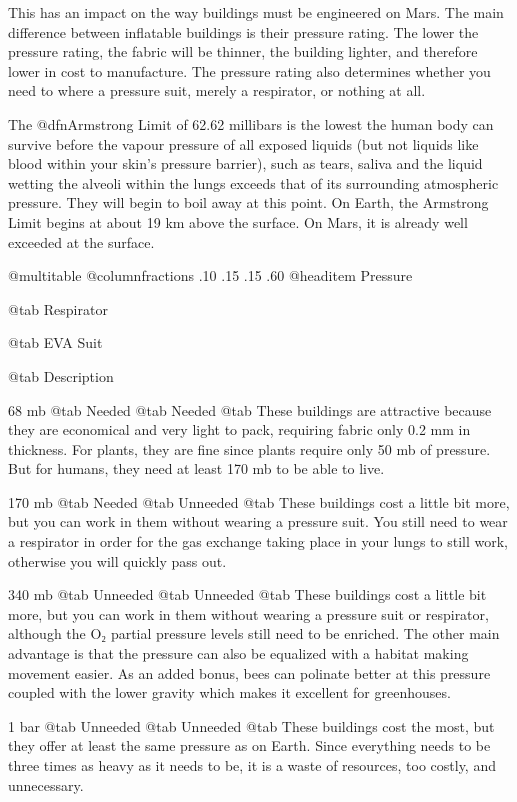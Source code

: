 This has an impact on the way buildings must be engineered on Mars. The main difference between inflatable buildings is their pressure rating. The lower the pressure rating, the fabric will be thinner, the building lighter, and therefore lower in cost to manufacture. The pressure rating also determines whether you need to where a pressure suit, merely a respirator, or nothing at all.

The @dfn{Armstrong Limit} of 62.62 millibars is the lowest the human body can survive before the vapour pressure of all exposed liquids (but not liquids like blood within your skin's pressure barrier), such as tears, saliva and the liquid wetting the alveoli within the lungs exceeds that of its surrounding atmospheric pressure. They will begin to boil away at this point. On Earth, the Armstrong Limit begins at about 19 km above the surface. On Mars, it is already well exceeded at the surface.

@multitable @columnfractions .10 .15 .15 .60
@headitem Pressure

@tab Respirator

@tab EVA Suit

@tab Description

\item68 mb
@tab Needed
@tab Needed
@tab These buildings are attractive because they are economical and very light to pack, requiring fabric only 0.2 mm in thickness. For plants, they are fine since plants require only 50 mb of pressure. But for humans, they need at least 170 mb to be able to live.

\item170 mb
@tab Needed
@tab Unneeded
@tab These buildings cost a little bit more, but you can work in them without wearing a pressure suit. You still need to wear a respirator in order for the gas exchange taking place in your lungs to still work, otherwise you will quickly pass out.

\item340 mb
@tab Unneeded
@tab Unneeded
@tab These buildings cost a little bit more, but you can work in them without wearing a pressure suit or respirator, although the O₂ partial pressure levels still need to be enriched. The other main advantage is that the pressure can also be equalized with a habitat making movement easier. As an added bonus, bees can polinate better at this pressure coupled with the lower gravity which makes it excellent for greenhouses.

\item1 bar
@tab Unneeded
@tab Unneeded
@tab These buildings cost the most, but they offer at least the same pressure as on Earth. Since everything needs to be three times as heavy as it needs to be, it is a waste of resources, too costly, and unnecessary.

